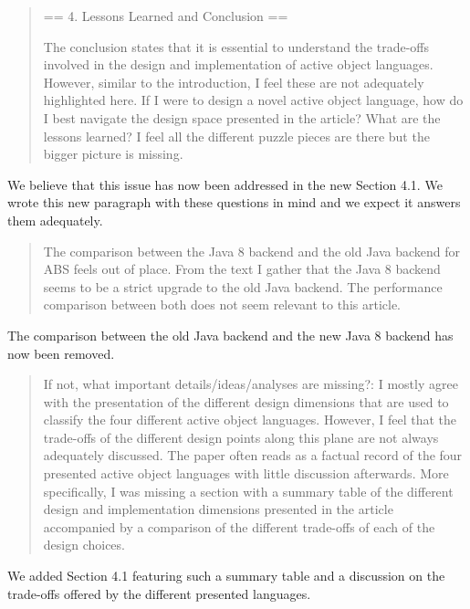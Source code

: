 \documentclass{article}
\begin{document}
\begin{quote}
	== 4. Lessons Learned and Conclusion ==

The conclusion states that it is essential to understand the trade-offs involved in the 
design and implementation of active object languages. However, similar to the 
introduction, I feel these are not adequately highlighted here. If I were to design a 
novel active object language, how do I best navigate the design space presented in the 
article? What are the lessons learned? I feel all the different puzzle pieces are there 
but the bigger picture is missing.
\end{quote}
We believe that this issue has now been addressed in the new Section 4.1. We wrote this 
new paragraph with these questions in mind and we expect it answers them adequately.


\begin{quote}
 The comparison between the Java 8 backend and the old Java backend 
for ABS feels out of place. From the text I gather that the Java 8 backend seems to be a 
strict upgrade to the old Java backend. The performance comparison between both does not 
seem relevant to this article.
\end{quote}
The comparison between the old Java backend and the new Java 8 backend has now been 
removed.

\begin{quote}
	If not, what important details/ideas/analyses are missing?: I mostly agree with the 
presentation of the different design dimensions that are used to classify the four 
different active object languages. However, I feel that the trade-offs of the different 
design points along this plane are not always adequately discussed. The paper often reads 
as a factual record of the four presented active object languages with little discussion 
afterwards. More specifically, I was missing a section with a summary table of the 
different design and implementation dimensions presented in the article accompanied by a 
comparison of the different trade-offs of each of the design choices.
\end{quote}
We added  Section 4.1 featuring such a summary table and a discussion on the 
trade-offs offered by the different presented languages.
\end{document}
